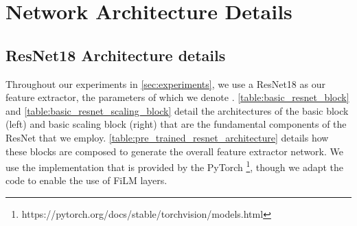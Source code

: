 \documentclass{article}
\theoremstyle{definition}
\begin{document}
\section{Network Architecture Details}
\label{app:network_architecture_details}

\subsection{ResNet18 Architecture details}
\label{app:resnet_architecture}

Throughout our experiments in \cref{sec:experiments}, we use a ResNet18 \citep{he2016deep} as our feature extractor, the parameters of which we denote . \cref{table:basic_resnet_block} and \cref{table:basic_resnet_scaling_block} detail the architectures of the basic block (left) and basic scaling block (right) that are the fundamental components of the ResNet that we employ. \cref{table:pre_trained_resnet_architecture} details how these blocks are composed to generate the overall feature extractor network. We use the implementation that is provided by the PyTorch \citep{paszke2017automatic}\footnote{https://pytorch.org/docs/stable/torchvision/models.html}, though we adapt the code to enable the use of FiLM layers.
\end{document}
